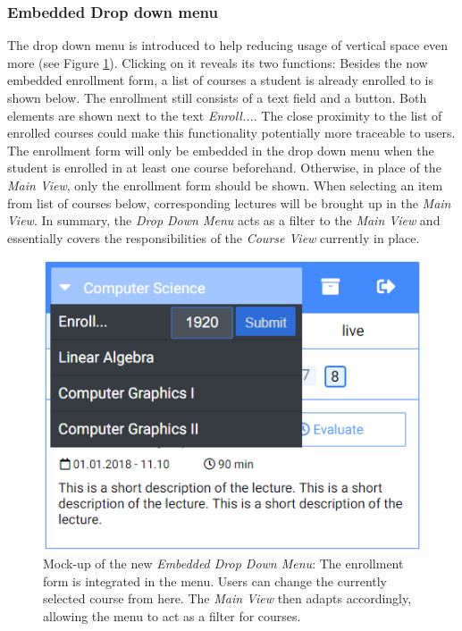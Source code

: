 \subsubsection{Embedded Drop down menu}
\label{section:con:proposals:dropdown}
The drop down menu is introduced to help reducing usage of vertical space even more (see Figure \ref{figure:embeddeddropdown}). Clicking on it reveals its two functions: Besides the now embedded enrollment form, a list of courses a student is already enrolled to is shown below. The enrollment still consists of a text field and a button. Both elements are shown next to the text \emph{Enroll...}. The close proximity to the list of enrolled courses could make this functionality potentially more traceable to users. The enrollment form will only be embedded in the drop down menu when the student is enrolled in at least one course beforehand. Otherwise, in place of the \emph{Main View}, only the enrollment form should be shown.
When selecting an item from list of courses below, corresponding lectures will be brought up in the \emph{Main View}.
In summary, the \emph{Drop Down Menu} acts as a filter to the \emph{Main View} and essentially covers the responsibilities of the \emph{Course View} currently in place.

\begin{figure}[ht]
	\begin{minipage}[t]{\textwidth}
		\centering
		\includegraphics[width=.7\textwidth]{mockups/embedded_drop_down.png}
		\captionsetup{width=.8\linewidth}
		\caption{Mock-up of the new \emph{Embedded Drop Down Menu}:
			The enrollment form is integrated in the menu. Users can change the currently selected course from here. The \emph{Main View} then adapts accordingly, allowing the menu to act as a filter for courses.
		}
		\label{figure:embeddeddropdown}
	\end{minipage}
\end{figure}

